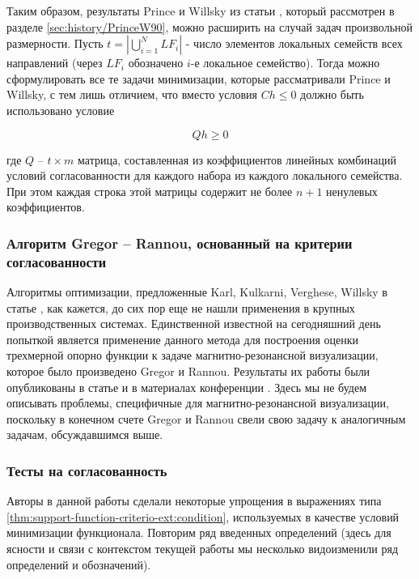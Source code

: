\documentclass[a4paper, 12pt, titlepage]{article}
\theoremstyle{definition}
\theoremstyle{plain}
\theoremstyle{plain}
\begin{document}
Таким образом, результаты Prince и Willsky из
статьи \cite{journals/pami/PrinceW90}, который рассмотрен в разделе
\ref{sec:history/PrinceW90}, можно расширить на случай задач произвольной
размерности. Пусть $t = |\bigcup \limits_{i = 1}^{N} LF_{i}|$ - число элементов
локальных семейств всех направлений (через $LF_{i}$ обозначено $i$-е локальное
семейство). Тогда можно сформулировать все те задачи минимизации, которые
рассматривали Prince и Willsky, с тем лишь отличием, что вместо условия
$Ch \leq 0$ должно быть использовано условие

\begin{equation}
 Q h \geq 0
\end{equation}

где $Q$ -- $t \times m$ матрица, составленная из коэффициентов линейных
комбинаций условий согласованности для каждого набора из каждого локального
семейства. При этом каждая строка этой матрицы содержит не более $n + 1$
ненулевых коэффициентов.

\subsubsection{Алгоритм Gregor -- Rannou, основанный на критерии
согласованности}

Алгоритмы оптимизации, предложенные Karl, Kulkarni, Verghese, Willsky в статье
\cite{journals/jmiv/KarlKVW96}, как кажется, до сих пор еще не нашли применения
в крупных производственных системах. Единственной известной на
сегодняшний день попыткой является применение данного метода для построения
оценки трехмерной опорно функции к задаче магнитно-резонансной визуализации,
которое было произведено Gregor и Rannou. Результаты их работы были
опубликованы в статье \cite{journals/ijist/GregorR2002} и в материалах
конференции \cite{conf/spie/GregorR2001}. Здесь мы не будем описывать
проблемы, специфичные для магнитно-резонансной визуализации, поскольку в
конечном счете Gregor и Rannou свели свою задачу к аналогичным задачам,
обсуждавшимся выше.

\subsubsection{Тесты на согласованность}

Авторы в данной работы сделали некоторые упрощения в выражениях типа
\ref{thm:support-function-criterio-ext:condition}, используемых в качестве
условий минимизации функционала. Повторим ряд введенных определений (здесь для
ясности и связи с контекстом текущей работы мы несколько видоизменили ряд
определений и обозначений).
\end{document}
